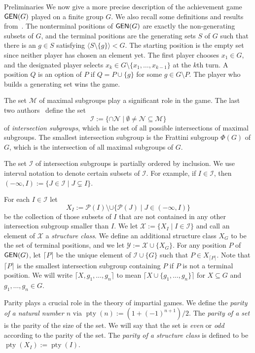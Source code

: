 \documentclass[12pt]{amsart}
\theoremstyle{definition}
\theoremstyle{definition}
\numberwithin{equation}{section}
\begin{document}
\begin{section}{Preliminaries}
We now give a more precise description of the achievement game ${\text{\sf GEN}}(G)$ played on a finite group $G$. We also recall some definitions and results from~\cite{ErnstSieben}. 
The nonterminal positions of ${\text{\sf GEN}}(G)$ are exactly the non-generating subsets of $G$, 
and the terminal positions are the generating sets $S$ of $G$ such that there is an $g \in S$ satisfying $\langle S \setminus \{g\}\rangle < G$.  
The starting position is the empty set since neither player has chosen an element yet.
The first player chooses $x_{1}\in G$, and the designated player selects $x_{k}\in G\setminus\{x_{1},\ldots,x_{k-1}\}$ at the $k$th turn.
A position $Q$ is an option of $P$ if $Q=P \cup \{g\}$ for some $g \in G \setminus P$.  The player who builds a generating set wins the game. 

The set $\mathcal{M}$ of maximal subgroups play a significant role in the game.  The last two authors~\cite{ErnstSieben} define the set \[ \mathcal{I}:=\{\cap\mathcal{N}\mid\emptyset\not=\mathcal{N\subseteq\mathcal{M}}\} \] of \emph{intersection subgroups}, which is the set of all possible intersections of maximal subgroups.  The smallest intersection subgroup is the Frattini subgroup $\Phi(G)$ of $G$, which is the intersection of all maximal subgroups of $G$. 

The set $\mathcal{I}$ of intersection subgroups is partially
ordered by inclusion. We use interval notation to denote certain subsets
of $\mathcal{I}$. For example, if $I\in\mathcal{I}$, then $(-\infty,I):=\{J\in\mathcal{I}\mid J\subsetneq I\}$. 

For each $I\in\mathcal{I}$ let
\[
X_{I}:=\mathcal{P}(I)\setminus\cup\{\mathcal{P}(J)\mid J\in(-\infty,I)\}
\]
be the collection of those subsets of $I$ that are not contained
in any other intersection subgroup smaller than $I$. We let $\mathcal{X}:=\{X_{I}\mid I\in\mathcal{I}\}$
and call an element of $\mathcal{X}$ a \emph{structure class}.  
We define an additional structure class $X_G$ to be the set of terminal positions, and we let $\mathcal{Y}:=\mathcal{X} \cup \{X_G\}$.   
For any position $P$ of ${\text{\sf GEN}}(G)$, let $\lceil P \rceil$ be the unique element of $\mathcal{I}\cup \{G\}$ such that $P\in X_{\lceil P \rceil}$.  
Note that $\lceil P \rceil$ is the smallest intersection subgroup containing $P$ if $P$ is not a terminal position.  
We will write $\lceil X,g_1,\ldots,g_n\rceil$ to mean $\lceil X \cup \{g_1,\ldots,g_n\}\rceil$ for $X \subseteq G$ and $g_1,\ldots,g_n \in G$.

Parity plays a crucial role in the theory of impartial games.
We define the \emph{parity of a natural number $n$} via ${\operatorname{pty}}(n):=(1+(-1)^{n+1})/2$. The \emph{parity of a set}
is the parity of the size of the set. 
We will say that the set is \emph{even} or \emph{odd} according to the parity of the set.
The \emph{parity of a structure class} is defined to be ${\operatorname{pty}}(X_{I}):={\operatorname{pty}}(I)$. 


\end{section}
\end{document}
